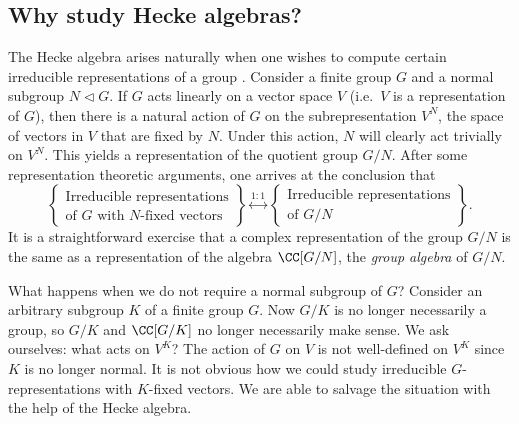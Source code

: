 \documentclass[11pt]{amsart}
\theoremstyle{remark}
\begin{document}
\subsection*{Why study Hecke algebras?}
The Hecke algebra arises naturally when one wishes to compute certain irreducible representations of a group \cite{Williamson21,CMHL03}.
Consider a finite group $G$ and a normal subgroup $N\triangleleft G$.
If $G$ acts linearly on a vector space $V$ (i.e.\ $V$ is a representation of $G$), then there is a natural action of $G$ on the subrepresentation $V^N$, the space of vectors in $V$ that are fixed by $N$.
Under this action, $N$ will clearly act trivially on $V^N$.
This yields a representation of the quotient group $G/N$.
After some representation theoretic arguments, one arrives at the conclusion that
\[
	\left\{\begin{array}{c}
		\text{Irreducible representations} \\
		\text{of $G$ with $N$-fixed vectors}
	\end{array}\right\}
	\stackrel{1:1}{\longleftrightarrow}
	\left\{\begin{array}{c}
		\text{Irreducible representations} \\
		\text{of $G/N$}
	\end{array}\right\}.
\]
It is a straightforward exercise that a complex representation of the group $G/N$ is the same as a representation of the algebra $\CC[G/N]$, the \emph{group algebra} of $G/N$.

What happens when we do not require a normal subgroup of $G$? Consider an arbitrary subgroup $K$ of a finite group $G$.
Now $G/K$ is no longer necessarily a group, so $G/K$ and $\CC[G/K]$ no longer necessarily make sense.
We ask ourselves: what acts on $V^K$?
The action of $G$ on $V$ is not well-defined on $V^K$ since $K$ is no longer normal.
It is not obvious how we could study irreducible $G$-representations with $K$-fixed vectors.
We are able to salvage the situation with the help of the Hecke algebra.
\end{document}
